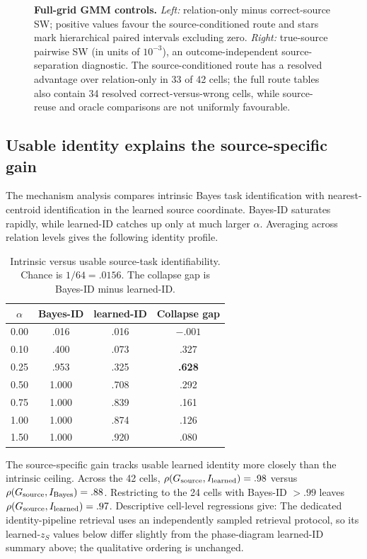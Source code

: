 \begin{figure}[t]
\centering
\resizebox{.96\linewidth}{!}{}
\caption{\textbf{Full-grid GMM controls.} \emph{Left:} relation-only minus correct-source SW; positive values favour the source-conditioned route and stars mark hierarchical paired intervals excluding zero. \emph{Right:} true-source pairwise SW (in units of $10^{-3}$), an outcome-independent source-separation diagnostic. The source-conditioned route has a resolved advantage over relation-only in 33 of 42 cells; the full route tables also contain 34 resolved correct-versus-wrong cells, while source-reuse and oracle comparisons are not uniformly favourable.}
\label{fig:gmm-full-controls}
\end{figure}


\subsection{Usable identity explains the source-specific gain}

The mechanism analysis compares intrinsic Bayes task identification with nearest-centroid identification in the learned source coordinate. Bayes-ID saturates rapidly, while learned-ID catches up only at much larger $\alpha$. Averaging across relation levels gives the following identity profile.

\begin{table}[h]
\centering\small
\caption{Intrinsic versus usable source-task identifiability. Chance is $1/64=.0156$. The collapse gap is Bayes-ID minus learned-ID.}
\begin{tabular}{cccc}
\toprule
$\alpha$ & Bayes-ID & learned-ID & Collapse gap\\
\midrule
0.00 & .016 & .016 & $-.001$\\
0.10 & .400 & .073 & .327\\
0.25 & .953 & .325 & \textbf{.628}\\
0.50 & 1.000 & .708 & .292\\
0.75 & 1.000 & .839 & .161\\
1.00 & 1.000 & .874 & .126\\
1.50 & 1.000 & .920 & .080\\
\bottomrule
\end{tabular}
\end{table}

The source-specific gain tracks usable learned identity more closely than the intrinsic ceiling. Across the 42 cells, $\rho(G_{\rm source},I_{\rm learned})=.98$ versus $\rho(G_{\rm source},I_{\rm Bayes})=.88$. Restricting to the 24 cells with Bayes-ID $>.99$ leaves $\rho(G_{\rm source},I_{\rm learned})=.97$. Descriptive cell-level regressions give:
The dedicated identity-pipeline retrieval uses an independently sampled retrieval protocol, so its learned-$z_S$ values below differ slightly from the phase-diagram learned-ID summary above; the qualitative ordering is unchanged.


